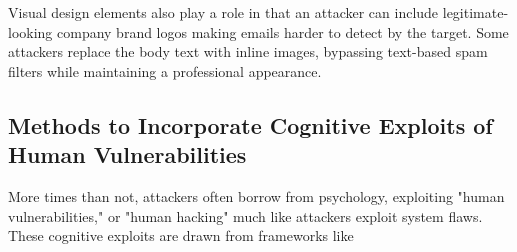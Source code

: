 Visual design elements also play a role in that an attacker can include legitimate-looking company brand logos making emails harder to detect by the target. Some attackers replace the body text with inline images, bypassing text-based spam filters while maintaining a professional appearance.

\subsection{Methods to Incorporate Cognitive Exploits of Human Vulnerabilities}
More times than not, attackers often borrow from psychology, exploiting "human vulnerabilities," or "human hacking" much like attackers exploit system flaws. These cognitive exploits are drawn from frameworks like

 
















